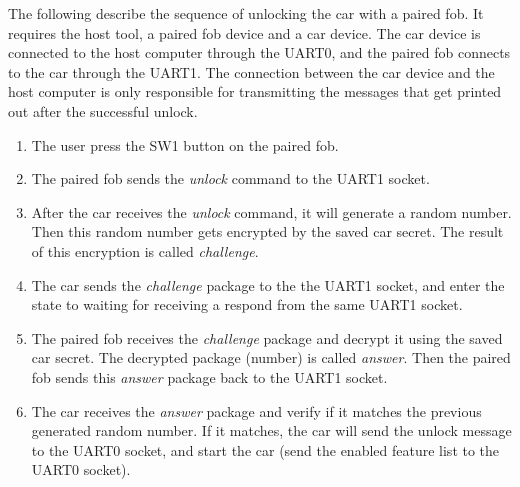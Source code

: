 \documentclass[11pt,oneside,onecolumn,letterpaper]{article}
\begin{document}
The following describe the sequence of unlocking the car with a paired fob. It requires the host tool, a paired fob device and a car device. The car device is connected to the host computer through the UART0, and the paired fob connects to the car through the UART1. The connection between the car device and the host computer is only responsible for transmitting the messages that get printed out after the successful unlock.
\begin{enumerate}
	\item The user press the SW1 button on the paired fob.
	\item The paired fob sends the \textit{unlock} command to the UART1 socket.
	\item After the car receives the \textit{unlock} command, it will generate a random number. Then this random number gets encrypted by the saved car secret. The result of this encryption is called \textit{challenge}.
	\item The car sends the \textit{challenge} package to the the UART1 socket, and enter the state to waiting for receiving a respond from the same UART1 socket.
	\item The paired fob receives the \textit{challenge} package and decrypt it using the saved car secret. The decrypted package (number) is called \textit{answer}. Then the paired fob sends this \textit{answer} package back to the UART1 socket.
	\item The car receives the \textit{answer} package and verify if it matches the previous generated random number. If it matches, the car will send the unlock message to the UART0 socket, and start the car (send the enabled feature list to the UART0 socket).
\end{enumerate}
\end{document}
